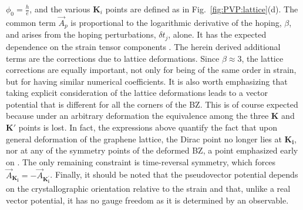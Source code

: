 $\phi_0=\frac{h}{e}$, and the various $\bm{K}_i$ points are defined as in Fig.~\ref{fig:PVP:lattice}(d).
The common term $\vec{A}_p$ is proportional to the logarithmic derivative of the hoping, $\beta$, and arises from the hoping perturbations, $\delta t_j$, alone.
It has the expected dependence on the strain tensor components \cite{CastroNeto2009,Vozmediano2010}. 
The herein derived additional terms are the corrections due to lattice deformations.
Since $\beta \approx 3$, the lattice corrections are equally important, not only for being of the same order in strain, but for having similar numerical coefficients.
It is also worth emphasizing that taking explicit consideration of the lattice deformations leads to a vector potential that is different for all the corners of the BZ.
This is of course expected because under an arbitrary deformation the equivalence among the three $\bm{K}$ and $\bm{K'}$ points is lost.
In fact, the expressions above quantify the fact that upon general deformation of the graphene lattice, the Dirac point no longer lies at $\bm{K_i}$, nor at any of the symmetry points of the deformed BZ, a point emphasized early on \cite{Pereira2009}.
The only remaining constraint is time-reversal symmetry, which forces $\vec{A}_{\bm{K_i}} = - \vec{A}_{\bm{K_i^\prime}}$.
Finally, it should be noted that the pseudovector potential depends on the crystallographic orientation relative to the strain and that, unlike a real vector potential, it has no gauge freedom as it is determined by an observable.

